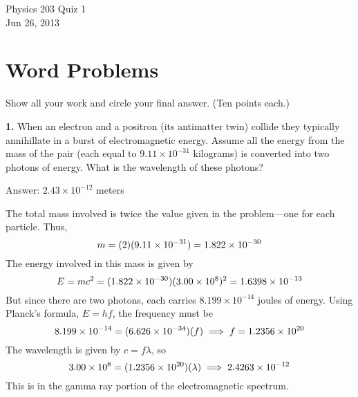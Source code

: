 \documentclass{article}
\begin{document}
\setcounter{page}{1}


\begin{center}
\LARGE{Physics 203 Quiz 1} \\[2mm]
\small{\sf Jun 26, 2013}
\end{center}

\thispagestyle{empty}

\section*{Word Problems}
Show all your work and circle your final answer. (Ten points each.) \par


\textbf{1.} \quad When an electron and a positron (its antimatter twin) collide they
typically annihillate in a burst of electromagnetic energy. Assume all
the energy from the mass of the pair (each equal to \(9.11 \times 10^{-31}\)
kilograms) is converted into two photons of energy. What is the
wavelength of these photons?
\par {\footnotesize\sf Answer: \(2.43 \times 10^{-12}\) meters}
\par The total mass involved is twice the value given in the problem---one
for each particle. Thus,
%
\begin{equation*}
m = (2)(9.11 \times 10^{-31})
= 1.822 \times 10^{-30}
\end{equation*}
The energy involved in this mass is given by
%
\begin{equation*}
E = mc^2
= (1.822 \times 10^{-30})(3.00 \times 10^{8})^2
= 1.6398 \times 10^{-13}
\end{equation*}
But since there are two photons, each carries \(8.199 \times 10^{-14}\) joules
of energy. Using Planck's formula, $E = hf$, the frequency must be
%
\begin{equation*}
8.199 \times 10^{-14} = (6.626 \times 10^{-34})(f)
\implies f = 1.2356 \times 10^{20}
\end{equation*}
The wavelength is given by $c = f\lambda$, so
%
\begin{equation*}
3.00 \times 10^{8} = (1.2356 \times 10^{20})(\lambda)
\implies 2.4263 \times 10^{-12}
\end{equation*}
This is in the gamma ray portion of the electromagnetic spectrum.
\newpage
\end{document}
